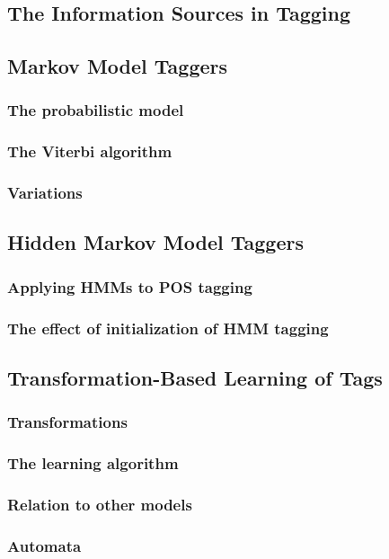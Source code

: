 \documentclass[a4paper]{article}
\begin{document}
\subsection{The Information Sources in Tagging}
\subsection{Markov Model Taggers}
\subsubsection{The probabilistic model}
\subsubsection{The Viterbi algorithm}
\subsubsection{Variations}
\subsection{Hidden Markov Model Taggers}
\subsubsection{Applying HMMs to POS tagging}
\subsubsection{The effect of initialization of HMM tagging}
\subsection{Transformation-Based Learning of Tags}
\subsubsection{Transformations}
\subsubsection{The learning algorithm}
\subsubsection{Relation to other models}
\subsubsection{Automata}
\end{document}

